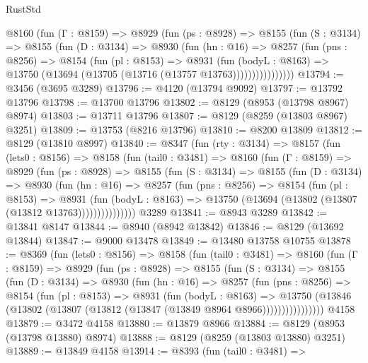 \begin{lexlean}{RustStd}
\begin{coremodule}
          @8160
            (fun (Γ : @8159) =>
            @8929
              (fun (ps : @8928) =>
              @8155
                (fun (S : @3134) =>
                @8155
                  (fun (D : @3134) =>
                  @8930
                    (fun (hn : @16) =>
                    @8257
                      (fun (pns : @8256) =>
                      @8154
                        (fun (pl : @8153) =>
                        @8931
                          (fun (bodyL : @8163) =>
                          @13750 (@13694 (@13705 (@13716 (@13757 @13763))))))))))))))))
@13794 := @3456 (@3695 @3289)
@13796 := @4120 (@13794 @9092)
@13797 := @13792 @13796
@13798 := @13700 @13796
@13802 := @8129 (@8953 (@13798 @8967) @8974)
@13803 := @13711 @13796
@13807 := @8129 (@8259 (@13803 @8967) @3251)
@13809 := @13753 (@8216 @13796)
@13810 := @8200 @13809
@13812 := @8129 (@13810 @8997)
@13840 := @8347
    (fun (rty : @3134) =>
    @8157
      (fun (lets0 : @8156) =>
      @8158
        (fun (tail0 : @3481) =>
        @8160
          (fun (Γ : @8159) =>
          @8929
            (fun (ps : @8928) =>
            @8155
              (fun (S : @3134) =>
              @8155
                (fun (D : @3134) =>
                @8930
                  (fun (hn : @16) =>
                  @8257
                    (fun (pns : @8256) =>
                    @8154
                      (fun (pl : @8153) =>
                      @8931
                        (fun (bodyL : @8163) =>
                        @13750 (@13694 (@13802 (@13807 (@13812 @13763)))))))))))))))
    @3289
@13841 := @8943 @3289
@13842 := @13841 @8147
@13844 := @8940 (@8942 @13842)
@13846 := @8129 (@13692 @13844)
@13847 := @9000 @13478
@13849 := @13480 @13758 @10755
@13878 := @8369
    (fun (lets0 : @8156) =>
    @8158
      (fun (tail0 : @3481) =>
      @8160
        (fun (Γ : @8159) =>
        @8929
          (fun (ps : @8928) =>
          @8155
            (fun (S : @3134) =>
            @8155
              (fun (D : @3134) =>
              @8930
                (fun (hn : @16) =>
                @8257
                  (fun (pns : @8256) =>
                  @8154
                    (fun (pl : @8153) =>
                    @8931
                      (fun (bodyL : @8163) =>
                      @13750
                        (@13846 (@13802 (@13807 (@13812 (@13847 (@13849 @8964 @8966))))))))))))))))
    @4158
@13879 := @3472 @4158
@13880 := @13879 @8966
@13884 := @8129 (@8953 (@13798 @13880) @8974)
@13888 := @8129 (@8259 (@13803 @13880) @3251)
@13889 := @13849 @4158
@13914 := @8393
    (fun (tail0 : @3481) =>

\end{coremodule}
\end{lexlean}
